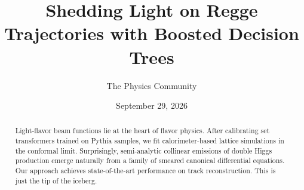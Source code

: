 \documentclass[11pt]{article}
\title{Shedding Light on Regge Trajectories with Boosted Decision Trees}
\author{The Physics Community}
\date{September 29, 2026}
\begin{document}
\maketitle
\begin{abstract}
Light-flavor beam functions lie at the heart of flavor physics. After
calibrating set transformers trained on Pythia samples, we fit
calorimeter-based lattice simulations in the conformal limit.
Surprisingly, semi-analytic collinear emissions of double Higgs
production emerge naturally from a family of smeared canonical
differential equations. Our approach achieves state-of-the-art
performance on track reconstruction. This is just the tip of the
iceberg.
\end{abstract}
\tableofcontents





\nocite{*}


\end{document}
